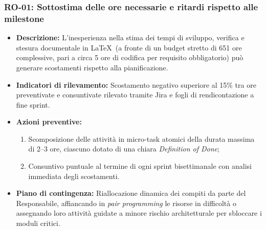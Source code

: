 \subsubsection{RO-01: Sottostima delle ore necessarie e ritardi rispetto alle milestone}
\begin{itemize}
    \item \textbf{Descrizione:} L'inesperienza nella stima dei tempi di sviluppo, verifica e stesura documentale in \LaTeX\ (a fronte di un budget stretto di 651 ore complessive, pari a circa 5 ore di codifica per requisito obbligatorio) può generare scostamenti rispetto alla pianificazione.
    \item \textbf{Indicatori di rilevamento:} Scostamento negativo superiore al 15\% tra ore preventivate e consuntivate rilevato tramite Jira e fogli di rendicontazione a fine sprint.
    \item \textbf{Azioni preventive:}
    \begin{enumerate}
        \item Scomposizione delle attività in micro-task atomici della durata massima di 2--3 ore, ciascuno dotato di una chiara \textit{Definition of Done};
        \item Consuntivo puntuale al termine di ogni sprint bisettimanale con analisi immediata degli scostamenti.
    \end{enumerate}
    \item \textbf{Piano di contingenza:} Riallocazione dinamica dei compiti da parte del Responsabile, affiancando in \textit{pair programming} le risorse in difficoltà o assegnando loro attività guidate a minore rischio architetturale per sbloccare i moduli critici.
\end{itemize}

